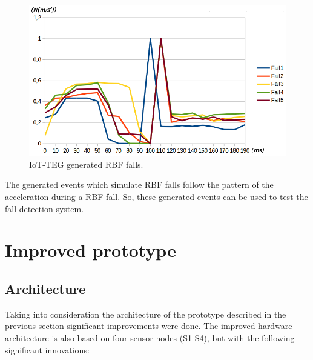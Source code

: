 \documentclass[journal]{IEEEtran}
\begin{document}
\begin{figure}[!ht]
  \centering
  \includegraphics[scale=0.25]{img/IoTTEGRBFGeneratedEvents}
  \caption[IoT-TEG generated RBF falls]{IoT-TEG generated RBF falls.}
  \label{fig:IoTTEGRBFGeneratedEvents}
\end{figure}

The generated events which simulate RBF falls follow the pattern of the acceleration during a RBF fall.
So, these generated events can be used to test the fall detection system.

\section{Improved prototype}
\label{sec:improvedprototype}

\subsection{Architecture}
\label{sub:improvedprototypearchitecture}

Taking into consideration the architecture of the prototype described in the previous 
section significant improvements were done. The improved hardware architecture is also 
based on four sensor nodes (S1-S4), but with the following significant innovations:
\end{document}
